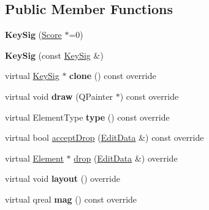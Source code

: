 \subsection*{Public Member Functions}
\begin{DoxyCompactItemize}
\item 
\mbox{\label{class_ms_1_1_key_sig_ac7d0897d512be0a93f4dee9537d66765}} 
{\bfseries Key\+Sig} (\hyperlink{class_ms_1_1_score}{Score} $\ast$=0)
\item 
\mbox{\label{class_ms_1_1_key_sig_ad79ad55a4ce361cbdd3de35ebb77550b}} 
{\bfseries Key\+Sig} (const \hyperlink{class_ms_1_1_key_sig}{Key\+Sig} \&)
\item 
\mbox{\label{class_ms_1_1_key_sig_a113fdcc8b4cfcb9f15a8a1f660b6ec17}} 
virtual \hyperlink{class_ms_1_1_key_sig}{Key\+Sig} $\ast$ {\bfseries clone} () const override
\item 
\mbox{\label{class_ms_1_1_key_sig_ab2c41ba596ae3a1eeac31bc173d7c1e2}} 
virtual void {\bfseries draw} (Q\+Painter $\ast$) const override
\item 
\mbox{\label{class_ms_1_1_key_sig_a02d48cece9b23346b905f9b535be18e7}} 
virtual Element\+Type {\bfseries type} () const override
\item 
virtual bool \hyperlink{class_ms_1_1_key_sig_a87cd45c1e8bd14b8da2889dc5ccbd4e9}{accept\+Drop} (\hyperlink{class_ms_1_1_edit_data}{Edit\+Data} \&) const override
\item 
virtual \hyperlink{class_ms_1_1_element}{Element} $\ast$ \hyperlink{class_ms_1_1_key_sig_aa151797b5a5391bdd93b07d754ab370e}{drop} (\hyperlink{class_ms_1_1_edit_data}{Edit\+Data} \&) override
\item 
\mbox{\label{class_ms_1_1_key_sig_a50ff6fe9275deb66132ebc4166bf8207}} 
virtual void {\bfseries layout} () override
\item 
\mbox{\label{class_ms_1_1_key_sig_a82035150fc1a7627ab5f75addc660c3b}} 
virtual qreal {\bfseries mag} () const override
\item 
\mbox{\label{class_ms_1_1_key_sig_aa55156945479d8344da3941c36b9a191}} 

\end{DoxyCompactItemize}
